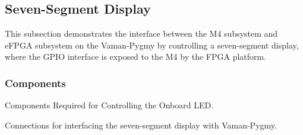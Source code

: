 \subsection{Seven-Segment Display}
This subsection demonstrates the interface between the M4 subsystem and eFPGA
subsystem on the Vaman-Pygmy by controlling a seven-segment display, where the
GPIO interface is exposed to the M4 by the FPGA platform.

\subsubsection{Components}
\begin{table}[!ht]
    \centering
    
    \caption{Components Required for Controlling the Onboard LED.}
    \label{tab:m4-fpga-sevenseg-components}
\end{table}

\begin{table}[!ht]
    \centering
    
    \caption{Connections for interfacing the seven-segment display with Vaman-Pygmy.}
    \label{tab:m4-fpga-sevenseg-connections}
\end{table}

